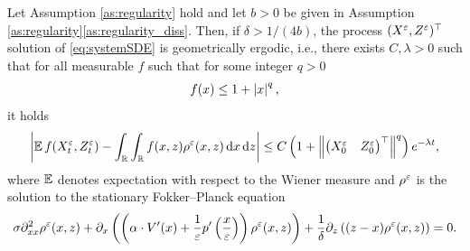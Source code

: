 \documentclass[10pt]{article}
\begin{document}
\begin{lemma}\label{lem:ergodicity} Let Assumption \ref{as:regularity} hold and let $b > 0$ be given in Assumption \ref{as:regularity}\ref{as:regularity_diss}. Then, if $\delta > 1/(4b)$, the process $(X^\varepsilon, Z^\varepsilon)^\top$ solution of \eqref{eq:systemSDE} is geometrically ergodic, i.e., there exists $C, \lambda > 0$ such that for all measurable $f$ such that for some integer $q > 0$ 
	\begin{equation}
		f(x) \leq 1 + \left\lvert x\right\rvert^q,
	\end{equation}
	it holds
	\begin{equation}
		\left\lvert\operatorname{\mathbb{E}} f(X^\varepsilon_t, Z^\varepsilon_t) - \int_{\mathbb{R}}\int_{\mathbb{R}} f(x, z) \rho^\varepsilon(x, z) \,\mathrm{d} x \,\mathrm{d} z\right\rvert \leq C\left(1 + \left\|\begin{pmatrix} X^\varepsilon_0 & Z^\varepsilon_0 \end{pmatrix}^\top\right\|^q \right)e^{-\lambda t},
	\end{equation}
	where $\operatorname{\mathbb{E}}$ denotes expectation with respect to the Wiener measure and $\rho^\varepsilon$ is the solution to the stationary Fokker--Planck equation
	\begin{equation}
	\label{eq:FPsystem}
	\sigma \partial^2_{xx} \rho^\varepsilon(x,z) +  \partial_x \left( \left( \alpha \cdot V'(x) + \frac{1}{\varepsilon} p' \left ( \frac{x}{\varepsilon} \right ) \right ) \rho^\varepsilon(x,z) \right) + \frac{1}{\delta} \partial_z \left((z - x) \rho^\varepsilon(x,z)\right) = 0.
	\end{equation}
\end{lemma}
\end{document}
